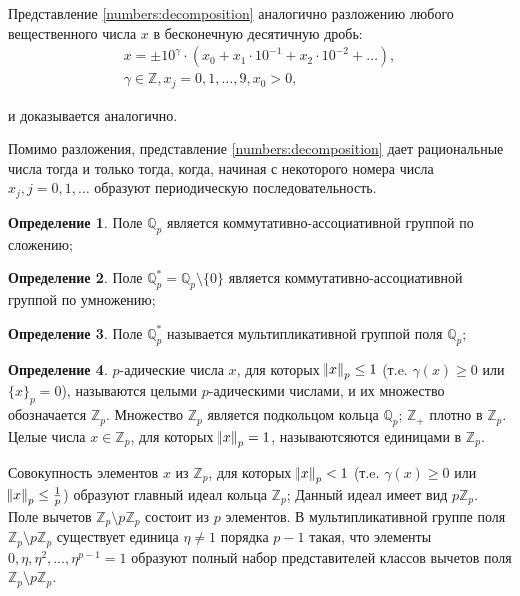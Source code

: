 \documentclass[och, master]{SCWorks}
\theoremstyle{plain}
\theoremstyle{plain}
\theoremstyle{plain}
\theoremstyle{definition}
\newtheorem{defn}{Определение}
\begin{document}
Представление \eqref{numbers:decomposition} аналогично разложению любого вещественного числа $x$ в бесконечную десятичную дробь:
\begin{equation*}
\begin{aligned}
	x=\pm10^\gamma \cdot (x_0 + x_1 \cdot 10^{-1} + x_2 \cdot 10^{-2} + \dots),\\
	\gamma \in \mathbb {Z}, x_j = 0, 1, \dots, 9, x_0 > 0,
\end{aligned}
\end{equation*}

\noindent и доказывается аналогично.

Помимо разложения, представление \eqref{numbers:decomposition} дает рациональные числа тогда и только тогда, когда, начиная с некоторого номера числа $x_j, j=0,1,\dots$ образуют периодическую последовательность.

\begin{defn}
Поле $\mathbb {Q}_p$ является коммутативно-ассоциативной группой по сложению;
\end{defn}

\begin{defn}
Поле $\mathbb {Q}_p^*=\mathbb {Q}_p \setminus \{0\}$ является коммутативно-ассоциативной группой по умножению;
\end{defn}

\begin{defn}
Поле $\mathbb {Q}_p^*$ называется мультипликативной группой поля $\mathbb {Q}_p$\cite{bib:analysis:baker};
\end{defn}

\begin{defn}
$p$-адические числа $x$, для которых $\norm{x}_p \le 1$ (т.e. $\gamma(x) \ge 0$ или $\{x\}_p=0$), называются целыми $p$-адическими числами, и их множество обозначается $\mathbb {Z}_p$. Множество $\mathbb {Z}_p$ является подкольцом кольца $\mathbb {Q}_p$; $\mathbb {Z}_+$ плотно в $\mathbb {Z}_p$. Целые числа $x \in \mathbb {Z}_p$, для которых $\norm{x}_p=1$, называютсяются единицами в $\mathbb {Z}_p$. \cite{bib:analysis:vladimirov}
\end{defn}

Совокупность элементов $x$ из $\mathbb {Z}_p$, для которых $\norm{x}_p < 1$ (т.e. $\gamma(x) \ge 0$ или $\norm{x}_p \le \frac{1}{p}$) образуют главный идеал кольца $\mathbb {Z}_p$; Данный идеал имеет вид $p\mathbb {Z}_p$. Поле вычетов $\mathbb {Z}_p \setminus p\mathbb {Z}_p$ состоит из $p$ элементов. В мультипликативной группе поля $\mathbb {Z}_p \setminus p\mathbb {Z}_p$ существует единица $\eta \ne 1$ порядка $p-1$ такая, что элементы $0, \eta, \eta^2, \dots, \eta^{p-1} = 1$ образуют полный набор представителей классов вычетов поля $\mathbb {Z}_p \setminus p\mathbb {Z}_p$.
\end{document}
